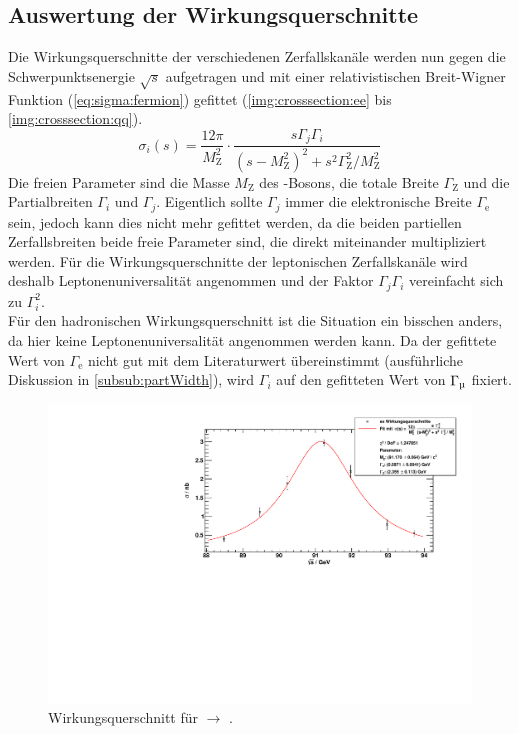 \subsection{Auswertung der Wirkungsquerschnitte}
Die Wirkungsquerschnitte der verschiedenen Zerfallskanäle werden nun gegen die Schwerpunktsenergie $\sqrt{s}$ aufgetragen und mit einer 
relativistischen Breit-Wigner Funktion (\autoref{eq:sigma:fermion}) gefittet (\autoref{img:crosssection:ee} bis \autoref{img:crosssection:qq}).
\begin{equation}
    \sigma_i(s) = \frac{12 \pi}{M_\text{Z}^2} \cdot \frac{s \Gamma_j \Gamma_i}{ \left( s - M_\text{Z}^2\right)^2 + s^2 \Gamma_\text{Z}^2 / M_\text{Z}^2 }
\end{equation}
Die freien Parameter sind die Masse $M_\text{Z}$ des \Z-Bosons, die totale Breite $\Gamma_\text{Z}$ und 
die Partialbreiten $\Gamma_i$ und $\Gamma_j$. Eigentlich sollte $\Gamma_j$ immer die elektronische Breite $\Gamma_\text{e}$ sein, jedoch 
kann dies nicht mehr gefittet werden, da die beiden partiellen Zerfallsbreiten beide freie Parameter sind, die direkt miteinander multipliziert 
werden. Für die Wirkungsquerschnitte der leptonischen Zerfallskanäle wird deshalb Leptonenuniversalität angenommen und der Faktor $\Gamma_j \Gamma_i$ 
vereinfacht sich zu $\Gamma_i^2$. \\
Für den hadronischen Wirkungsquerschnitt ist die Situation ein bisschen anders, da hier keine Leptonenuniversalität angenommen werden kann. 
Da der gefittete Wert von $\Gamma_\text{e}$ nicht gut mit dem Literaturwert übereinstimmt (ausführliche Diskussion in \autoref{subsub:partWidth}), 
wird $\Gamma_i$ auf den gefitteten Wert von $\Gamma_\text{\textmu}$ fixiert.

\begin{figure}[H]
    \begin{center}
        \includegraphics[width=\textwidth]{../img/crosssections_ee.pdf}
        \caption{Wirkungsquerschnitt für \ee $\to$ \ee.}
        \label{img:crosssection:ee}
    \end{center}
\end{figure}

